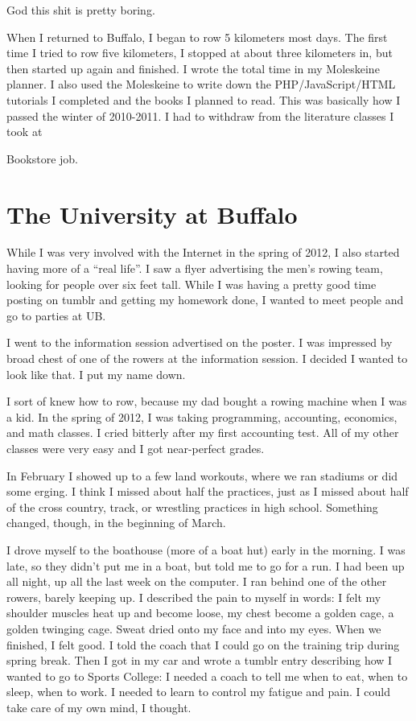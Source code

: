 \documentclass[12pt]{article}
\begin{document}
God this shit is pretty boring.

When I returned to Buffalo, I began to row 5 kilometers most days.  The first
time I tried to row five kilometers, I stopped at about three kilometers in, but
then started up again and finished.  I wrote the total time in my Moleskeine
planner.  I also used the Moleskeine to write down the PHP/JavaScript/HTML
tutorials I completed and the books I planned to read.  This was basically how I
passed the winter of 2010-2011.  I had to withdraw from the literature classes I
took at 

Bookstore job.  

\section{The University at Buffalo}
While I was very involved with the Internet in the spring of 2012, I also
started having more of a ``real life''.  I saw a flyer advertising the men's
rowing team, looking for people over six feet tall.  While I was having a
pretty good time posting on tumblr and getting my homework done, I wanted to
meet people and go to parties at UB. 

I went to the information session advertised on the poster.  I was impressed by
 broad chest of one of the rowers at the information session.  I decided I
wanted to look like that.  I put my name down.

I sort of knew how to row, because my dad bought a rowing machine when I was a
kid.  In the spring of 2012, I was taking programming, accounting, economics, and
math classes.  I cried bitterly after my first accounting test.  All of my
other classes were very easy and I got near-perfect grades.

In February I showed up to a few land workouts, where we ran stadiums or did
some erging.  I think I missed about half the practices, just as I missed about
half of the cross country, track, or wrestling practices in high school.
Something changed, though, in the beginning of March.

I drove myself to the boathouse (more of a boat hut) early in the morning.  I
was late, so they didn't put me in a boat, but told me to go for a run.  I had
been up all night, up all the last week on the computer.  I ran behind one of
the other rowers, barely keeping up.  I described the pain to myself in words: I
felt my shoulder muscles heat up and become loose, my chest become a golden
cage, a golden twinging cage.  Sweat dried onto my face and into my eyes.  When
we finished, I felt good.  I told the coach that I could go on the training trip
during spring break.  Then I got in my car and wrote a tumblr entry describing
how I wanted to go to Sports College: I needed a coach to tell me when to eat,
when to sleep, when to work.  I needed to learn to control my fatigue and pain.
I could take care of my own mind, I thought.
\end{document}
